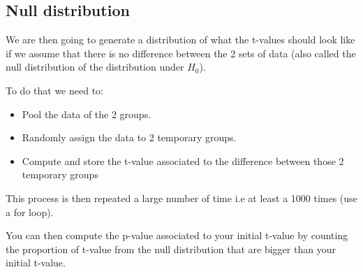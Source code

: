 \documentclass[a4paper,10pt]{article}
\begin{document}
\subsection{Null distribution}

We are then going to generate a distribution of what the t-values should look like if we assume that there is no difference between the 2 sets of data (also called the null distribution of the distribution under $H_{0}$).

To do that we need to:
\begin{itemize}
 \item Pool the data of the 2 groups.   
 \item Randomly assign the data to 2 temporary groups.
 \item Compute and store the t-value associated to the difference between those 2 temporary groups
\end{itemize}

This process is then repeated a large number of time i.e at least a 1000 times (use a for loop).

You can then compute the p-value associated to your initial t-value by counting the proportion of t-value from the null distribution that are bigger than your initial t-value.
\end{document}
